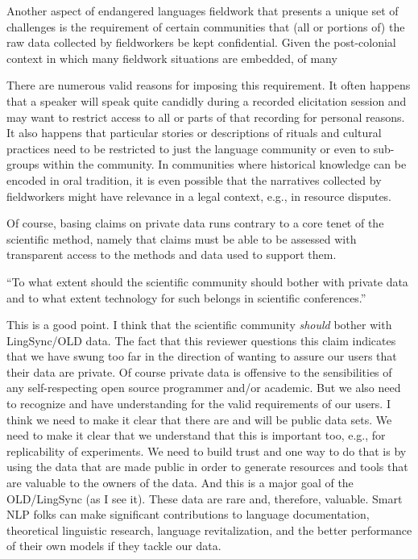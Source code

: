\documentclass[11pt]{article}
\begin{document}
Another aspect of endangered languages fieldwork that presents a unique set of
challenges is the requirement of certain communities that (all or portions of)
the raw data collected by fieldworkers be kept confidential. Given the
post-colonial context in which many fieldwork situations are embedded, of many 

There are numerous valid reasons for imposing this requirement. It often happens that a speaker
will speak quite candidly during a recorded elicitation session and may want to
restrict access to all or parts of that recording for personal reasons. It also
happens that particular stories or descriptions of rituals and cultural
practices need to be restricted to just the language community or even to
sub-groups within the community. In communities where historical knowledge can
be encoded in oral tradition, it is even possible that the narratives collected
by fieldworkers might have relevance in a legal context, e.g., in resource
disputes.

Of course, basing claims on private data runs contrary to a core tenet of the
scientific method, namely that claims must be able to be assessed with
transparent access to the methods and data used to support them.


``To what extent should the scientific community should bother with private data
and to what extent technology for such belongs in scientific conferences.''

This is a good point. I think that the scientific community \textit{should}
bother with LingSync/OLD data. The fact that this reviewer questions this claim
indicates that we have swung too far in the direction of wanting to assure our
users that their data are private. Of course private data is offensive to the
sensibilities of any self-respecting open source programmer and/or academic.
But we also need to recognize and have understanding for the valid requirements
of our users. I think we need to make it clear that there are and will be
public data sets. We need to make it clear that we understand that this is
important too, e.g., for replicability of experiments. We need to build trust
and one way to do that is by using the data that are made public in order to 
generate resources and tools that are valuable to the owners of the data. And 
this is a major goal of the OLD/LingSync (as I see it). These data are rare
and, therefore, valuable. Smart NLP folks can make significant contributions to
language documentation, theoretical linguistic research, language
revitalization, and the better performance of their own models if they tackle
our data.
\end{document}
